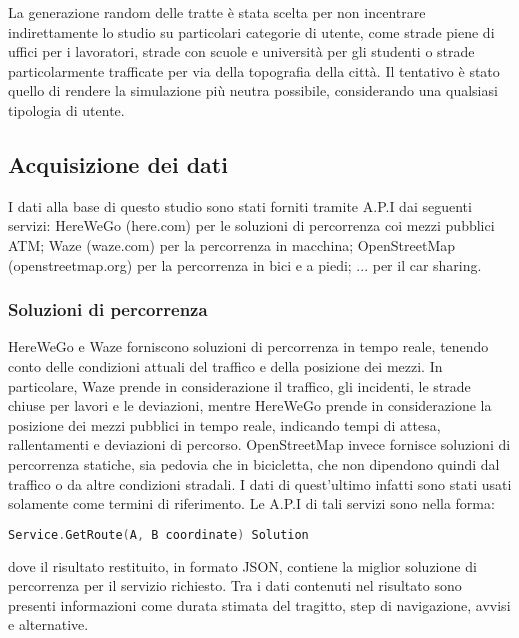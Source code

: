 La generazione random delle tratte è stata scelta per non incentrare indirettamente lo studio su particolari categorie di utente, come strade piene di uffici per i lavoratori, strade con scuole e università per gli studenti o strade particolarmente trafficate per via della topografia della città. Il tentativo è stato quello di rendere la simulazione più neutra possibile, considerando una qualsiasi tipologia di utente.


\subsection{Acquisizione dei dati}

I dati alla base di questo studio sono stati forniti tramite A.P.I dai seguenti servizi: HereWeGo (here.com) per le soluzioni di percorrenza coi mezzi pubblici ATM; Waze (waze.com) per la percorrenza in macchina; OpenStreetMap (openstreetmap.org) per la percorrenza in bici e a piedi; ... per il car sharing.

\subsubsection{Soluzioni di percorrenza}

HereWeGo e Waze forniscono soluzioni di percorrenza in tempo reale, tenendo conto delle condizioni attuali del traffico e della posizione dei mezzi. In particolare, Waze prende in considerazione il traffico, gli incidenti, le strade chiuse per lavori e le deviazioni, mentre HereWeGo prende in considerazione la posizione dei mezzi pubblici in tempo reale, indicando tempi di attesa, rallentamenti e deviazioni di percorso. OpenStreetMap invece fornisce soluzioni di percorrenza statiche, sia pedovia che in bicicletta, che non dipendono quindi dal traffico o da altre condizioni stradali. I dati di quest'ultimo infatti sono stati usati solamente come termini di riferimento. Le A.P.I di tali servizi sono nella forma:
\begin{lstlisting}[language=Go]
Service.GetRoute(A, B coordinate) Solution
\end{lstlisting}
dove il risultato restituito, in formato JSON, contiene la miglior soluzione di percorrenza per il servizio richiesto. Tra i dati contenuti nel risultato sono presenti informazioni come durata stimata del tragitto, step di navigazione, avvisi e alternative.


